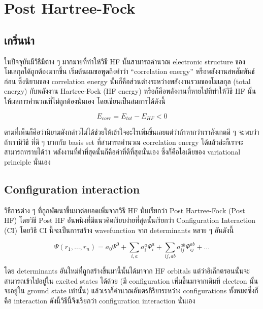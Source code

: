 
\chapter{Post Hartree-Fock}

\section{เกริ่นนำ}

ในปัจจุบันมีวิธีมีต่าง ๆ มากมายที่ทำให้วิธี HF นั้นสามารถคำนวณ electronic structure ของโมเลกุลได้ถูกต้องมากขึ้น
เริ่มต้นผมขอพูดถึงคำว่า \enquote{correlation energy} หรือพลังงานสหสัมพันธ์ก่อน ซึ่งนิยามของ correlation
energy นั้นก็คือส่วนต่างระหว่างพลังงานรวมของโมเลกุล (total energy) กับพลังงาน Hartree-Fock (HF energy)
หรือก็คือพลังงานที่หายไปที่ทำให้วิธี HF นั้นให้ผลการคำนวณที่ไม่ถูกต้องนั่นเอง โดยเขียนเป็นสมการได้ดังนี้

\begin{equation}
    E_{corr} = E_{tot} - E_{HF} < 0
\end{equation}

ตามที่เห็นก็คือว่านิยามดังกล่าวไม่ได้ช่วยให้เข้าใจอะไรเพิ่มขึ้นเลยแต่ว่าถ้าหากว่าเราสังเกตดี ๆ จะพบว่าถ้าเรามีวิธี%
ที่ดี ๆ บวกกับ basis set ที่สามารถคำนวณ correlation energy ได้แล้วล่ะก็เราจะสามารถทราบได้ว่า%
พลังงานที่ต่ำที่สุดนั้นก็คือค่าที่ดีที่สุดนั่นเอง ซึ่งก็คือไอเดียของ variational principle นั่นเอง

\section{Configuration interaction}

วิธีการต่าง ๆ ที่ถูกพัฒนาขึ้นมาต่อยอดเพิ่มจากวิธี HF นั่นเรียกว่า Post Hartree-Fock (Post HF)
โดยวิธี Post HF อันหนึ่งที่มีแนวคิดเรียบง่ายที่สุดนั้นเรียกว่า Configuration Interaction (CI)
โดยวิธี CI นี้จะเป็นการสร้าง wavefunction จาก determinants หลาย ๆ อันดังนี้

\begin{equation}
    \Psi(r_{1}, \dots, r_{n})
    =
    a_{0} \Psi^{0}
    + \sum_{i,a} a^{a}_{i} \Psi^{a}_{i}
    + \sum_{ij,ab} a^{ab}_{ij} \Psi^{ab}_{ij}
    + \dots
\end{equation}

โดย determinants อันใหม่ที่ถูกสร้างขึ้นมานี้นั้นได้มาจาก HF orbitals แต่ว่าอิเล็กตรอนนั้นจะสามารถเข้าไปอยู่ใน 
excited states ได้ด้วย (มี configuration เพิ่มขึ้นมาจากเดิมที่ electron นั้นจะอยู่ใน ground state 
เท่านั้น) แล้วเราก็คำนวณอันตรกิริยาระหว่าง configurations ทั้งหมดซึ่งก็คือ interaction ดังนี้วิธีนี้จึงเรียกว่า 
configuration interaction นั่นเอง 

